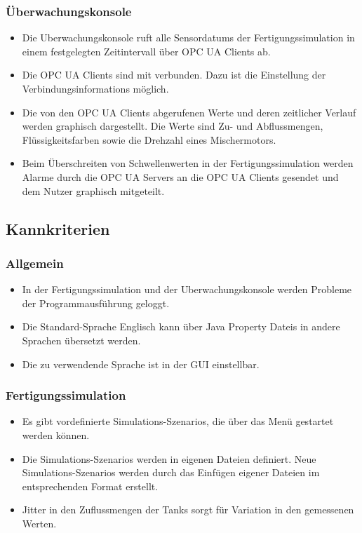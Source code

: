 \documentclass[parskip=full]{scrartcl}
\begin{document}
\subsubsection{Überwachungskonsole}
\begin{itemize}
  \item Die \gls{Uberwachungskonsole} ruft alle \glspl{Sensordatum} der \gls{Fertigungssimulation} in einem festgelegten Zeitintervall
  über \glspl{OPC UA Client} ab.
  \item Die \glspl{OPC UA Client} sind mit  verbunden. Dazu ist die Einstellung der \glspl{Verbindungsinformation} möglich.
  \item Die von den \glspl{OPC UA Client} abgerufenen Werte und deren zeitlicher Verlauf werden graphisch dargestellt. Die Werte sind Zu- und Abflussmengen,
    Flüssigkeitsfarben sowie die Drehzahl eines Mischermotors.
  \item Beim Überschreiten von Schwellenwerten in der \gls{Fertigungssimulation} werden Alarme durch die \glspl{OPC UA Server} an
  die \glspl{OPC UA Client} gesendet und dem Nutzer graphisch mitgeteilt.
\end{itemize}

\subsection{Kannkriterien}
\subsubsection{Allgemein}
\begin{itemize}
  \item In der \gls{Fertigungssimulation} und der \gls{Uberwachungskonsole} werden Probleme der Programmausf\"uhrung geloggt.
  \item Die Standard-Sprache Englisch kann über \glspl{Java Property Datei} in andere Sprachen übersetzt werden.
  \item Die zu verwendende Sprache ist in der \gls{GUI} einstellbar.
\end{itemize}

\subsubsection{Fertigungssimulation}
\begin{itemize}
  \item Es gibt vordefinierte \glspl{Simulations-Szenario}, die über das Menü gestartet werden können.
  \item Die \glspl{Simulations-Szenario} werden in eigenen Dateien definiert. Neue \glspl{Simulations-Szenario}
    werden durch das Einf\"ugen eigener Dateien im entsprechenden Format erstellt.
  \item \gls{Jitter} in den Zuflussmengen der Tanks sorgt f\"ur Variation in den gemessenen Werten.
\end{itemize}
\end{document}
